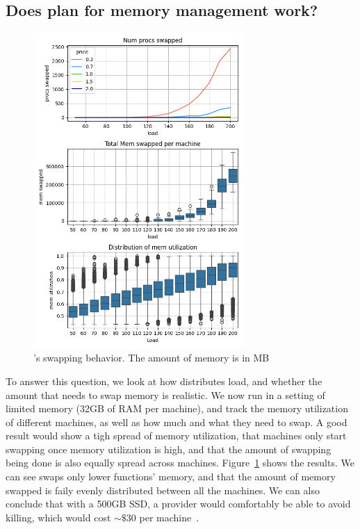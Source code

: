 \subsection{Does \sys{} plan for memory management work?}

\begin{figure}[t!]
    \centering
      \includegraphics[width=8cm]{img/memory_graphs.png}
      \caption{ \sys{}'s swapping behavior. The amount of memory is in MB  }
    \label{fig:memory-graphs}
\end{figure}

To answer this question, we look at how \sys{} distributes load, and whether the
amount that \sys{} needs to swap memory is realistic. We now run \sys{} in a
setting of limited memory (32GB of RAM per machine), and track the memory
utilization of different machines, as well as how much and what they need to
swap. A good result would show a tigh spread of memory utilization, that
machines only start swapping once memory utilization is high, and that the
amount of swapping being done is also equally spread across machines.
Figure~\ref{fig:memory-graphs} shows the results. We can see \sys{} swaps only
lower \class{} functions' memory, and that the amount of memory swapped is faily
evenly distributed between all the machines. We can also conclude that with a
500GB SSD, a provider would comfortably be able to avoid killing, which would
cost $\sim\$$30 per machine~\cite{ssd-price}.


